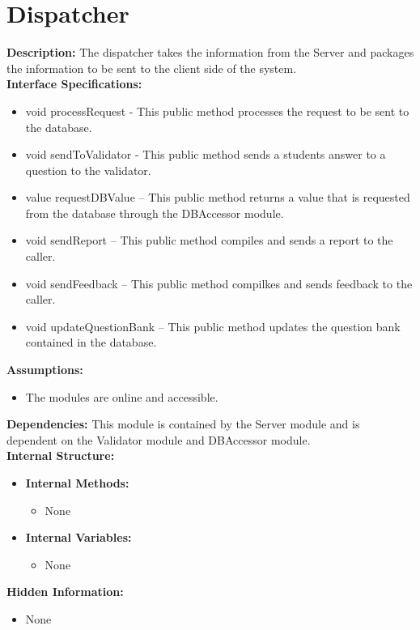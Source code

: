 \chapter{Dispatcher}
\textbf{Description:} The dispatcher takes the information from the Server and packages the information to be sent to the client side of the system. \\
\textbf{Interface Specifications:}
\begin{itemize}
\item{void processRequest - This public method processes the request to be sent to the database.}
\item{void sendToValidator - This public method sends a students answer to a question to the validator.}
\item{value requestDBValue -- This public method returns a value that is requested from the database through the DBAccessor module.}
\item{void sendReport -- This public method compiles and sends a report to the caller.}
\item{void sendFeedback -- This public method compilkes and sends feedback to the caller.}
\item{void updateQuestionBank -- This public method updates the question bank contained in the database.}
\end{itemize}
\textbf{Assumptions:}
\begin{itemize}
\item{The modules are online and accessible.} 
\end{itemize}
\textbf{Dependencies:}
This module is contained by the Server module and is dependent on the Validator module and DBAccessor module. \\
\textbf{Internal Structure:}
\begin{itemize}
        	\item{\textbf{Internal Methods:} 
        	\begin{itemize}
        	\item{None}
        	\end{itemize}}
        	\item{\textbf{Internal Variables:} 
        	\begin{itemize}
        	\item{None}
        	\end{itemize}}
\end{itemize}
\textbf{Hidden Information:}
\begin{itemize}
\item {None}
\end{itemize}


